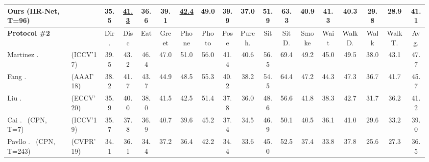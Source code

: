 \documentclass[sigconf]{acmart}
\begin{document}
\begin{table*}[t]
{\begin{tabular}{@{}ll|ccccccccccccccc|c@{}}
			Ours (HR-Net, T=96)                            &           &  \textbf{35.5}   & \underline{41.3} &  \textbf{36.6}   &  \textbf{39.1}   & \underline{42.4} &  \textbf{49.0}   &  \textbf{39.9}   &  \textbf{37.0}   &  \textbf{51.9}   &       63.3       &  \textbf{40.9}   &  \textbf{41.3}   &  \textbf{40.3}   &  \textbf{29.8}   &  \textbf{28.9}   &  \textbf{41.1}   \\ \toprule[1pt]
			\textbf{Protocol \#2}                                    &           &       Dir.       &       Disc       &       Eat        &      Greet       &      Phone       &      Photo       &       Pose       &      Purch.      &       Sit        &      SitD.       &      Smoke       &       Wait       &      WalkD.      &       Walk       &      WalkT.      &       Avg.       \\ \midrule[0.5pt]
			Martinez \etal.~\cite{martinez2017simple}                & (ICCV'17) &       39.5       &       43.2       &       46.4       &       47.0       &       51.0       &       56.0       &       41.4       &       40.6       &       56.5       &       69.4       &       49.2       &       45.0       &       49.5       &       38.0       &       43.1       &       47.7       \\
			Fang \etal.~\cite{fang2018learning}                      & (AAAI'18) &       38.2       &       41.7       &       43.7       &       44.9       &       48.5       &       55.3       &       40.2       &       38.2       &       54.5       &       64.4       &       47.2       &       44.3       &       47.3       &       36.7       &       41.7       &       45.7       \\
			Liu \etal.~\cite{liu2020comprehensive}                   & (ECCV'20) &       35.9       &       40.0       &       38.0       &       41.5       &       42.5       &       51.4       &       37.8       &       36.0       &       48.6       &       56.6       &       41.8       &       38.3       &       42.7       &       31.7       &       36.2       &       41.2       \\ \midrule[0.5pt]
			Cai \etal.~\cite{cai2019exploiting} (CPN, T=7) & (ICCV'19) &       35.7       &       37.8       &       36.9       &       40.7       &       39.6       &       45.2       &       37.4       &       34.5       &       46.9       &      {50.1}      &       40.5       &       36.1       &       41.0       &       29.6       &       33.2       &       39.0       \\
			Pavllo \etal.~\cite{pavllo20193d} (CPN, T=243) & (CVPR'19) &       34.1       &       36.1       &       34.4       &       37.2       &       36.4       &       42.2       &       34.4       &       33.6       &       45.0       &       52.5       &       37.4       &       33.8       &       37.8       &       25.6       &       27.3       &       36.5       \\

\end{tabular}}
\end{table*}
\end{document}
